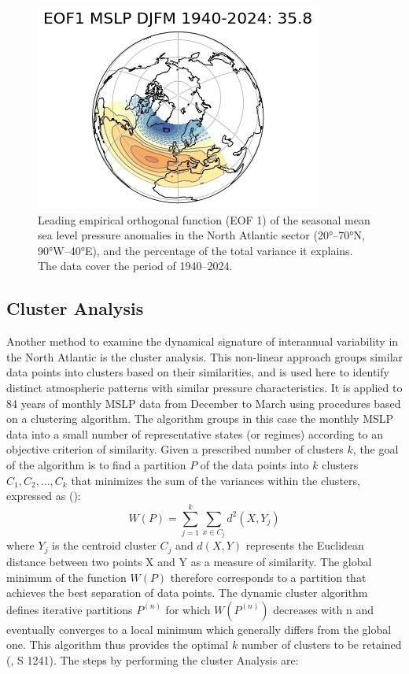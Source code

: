 \documentclass[
]{krantz}
\begin{document}
\begin{figure}

{\centering \includegraphics[width=0.6\linewidth]{work/05_nao/figures/EOF1} 

}

\caption{Leading empirical orthogonal function (EOF 1) of the seasonal mean sea level pressure anomalies in the North Atlantic sector (20°–70°N, 90°W–40°E), and the percentage of the total variance it explains. The data cover the period of 1940–2024.}\label{fig:EofPamela}
\end{figure}

\subsection{Cluster Analysis}\label{cluster-analysis}

Another method to examine the dynamical signature of interannual variability in the North Atlantic is the cluster analysis. This non-linear approach groups similar data points into clusters based on their similarities, and is used here to identify distinct atmospheric patterns with similar pressure characteristics. It is applied to 84 years of monthly MSLP data from December to March using procedures based on a clustering algorithm. The algorithm groups in this case the monthly MSLP data into a small number of representative states (or regimes) according to an objective criterion of similarity.
Given a prescribed number of clusters \(k\), the goal of the algorithm is to find a partition \(P\) of the data points into \(k\) clusters \(C_{1}, C_{2}, …, C_{k}\) that minimizes the sum of the variances within the clusters, expressed as (\citet{michelangeli1995}): \[W(P) = \sum_{j= 1}^k \sum_{x \in C_{j}} d^2(X, Y_{j})\] where \(Y_{j}\) is the centroid cluster \(C_{j}\) and \(d(X, Y)\) represents the Euclidean distance between two points X and Y as a measure of similarity. The global minimum of the function \(W(P)\) therefore corresponds to a partition that achieves the best separation of data points. The dynamic cluster algorithm defines iterative partitions \(P^{(n)}\) for which \(W(P^{(n)})\) decreases with n and eventually converges to a local minimum which generally differs from the global one. This algorithm thus provides the optimal \(k\) number of clusters to be retained (\citet{michelangeli1995}, S 1241).
The steps by performing the cluster Analysis are:
\end{document}
